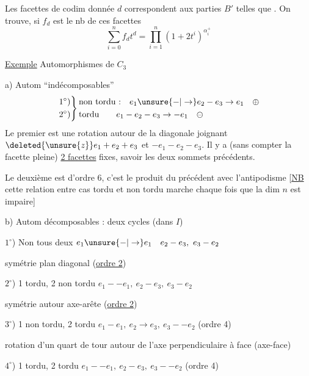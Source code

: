 Les facettes de codim donnée $d$ correspondent aux parties $B'$ telles que   . On trouve, si $f_d$ est le nb de ces facettes
\[
\boxed{\sum_{i=0}^n f_d t^d=\prod_{i=1}^n(1+2t^i)^{\alpha_i^+}}
\]

\uline{Exemple} Automorphismes de $C_3$

a) Autom ``indécomposables''
\[
\left.
\begin{aligned}
1^\circ)\\2^\circ)
\end{aligned}
\right\}
\begin{aligned}
&\text{non tordu :}\quad e_1\unsure{-|\to}e_2-e_3\to e_1\quad\oplus\\
&\text{tordu}\qquad e_1-e_2-e_3\to -e_1\quad\ominus
\end{aligned}
\]
Le premier est une rotation  autour de la diagonale joignant $\deleted{\unsure{z}}e_1+e_2+e_3$ et $-e_1-e_2-e_3$. Il y a (sans compter la facette pleine) \uline{2 facettes} fixes, savoir les deux sommets précédents.

Le deuxième est d'ordre 6,  c'est  le produit du précédent avec l'antipodisme [\uline{NB} cette relation entre cas tordu et non tordu marche chaque fois que la dim $n$ est impaire]

b) Autom décomposables : deux cycles (dans $I$)

$1^\circ$) Non  tous deux \quad $e_1\unsure{-|\to}e_1\quad e_2-e_3,\ e_3-e_2$

symétrie  plan diagonal (\uline{ordre 2})

$2^\circ$) 1 tordu, 2 non tordu \quad $e_1-{-e_1},\ e_2-e_3,\ e_3-e_2$

symétrie autour axe-arête  (\uline{ordre 2})

$3^\circ$) 1 non tordu, 2 tordu \quad $e_1-e_1,\ e_2\to e_3,\ e_3-{-e_2}$ (ordre 4)

rotation d'un quart de tour autour de l'axe perpendiculaire à  face (axe-face)

$4^\circ$) 1 tordu, 2 tordu \quad $e_1-{-e_1},\ e_2-e_3,\ e_3-{-e_2}$ (ordre 4)

